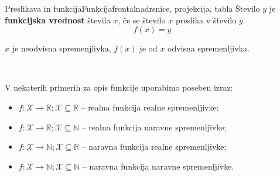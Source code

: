 \begin{priprava}{1}{}{Preslikava in funkcija}{Funkcija}{frontalna}{drsnice, projekcija, tabla}
        Število $y$ je \textbf{funkcijska vrednost} števila $x$, če se število $x$ preslika v število $y$. 
        $$ f(x)=y $$

        $x$ je neodvisna spremenjlivka, $f(x)$ je od $x$ odvisna spremenljivka.


~

        V nekaterih primerih za opis funkcije uporabimo poseben izraz:
        \begin{itemize}
            \item $f:\mathcal{X}\to\mathbb{R}; \mathcal{X}\subseteq\mathbb{R}$ -- realna funkcija realne spremenljivke;
            \item $f:\mathcal{X}\to\mathbb{R}; \mathcal{X}\subseteq\mathbb{N}$ -- realna funkcija naravne spremenljivke;
            \item $f:\mathcal{X}\to\mathbb{N}; \mathcal{X}\subseteq\mathbb{R}$ -- naravna funkcija realne spremenljivke;
            \item $f:\mathcal{X}\to\mathbb{N}; \mathcal{X}\subseteq\mathbb{N}$ -- naravna funkcija naravne spremenljivke.
        \end{itemize}



\end{priprava}